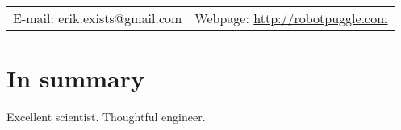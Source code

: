 \documentclass[margin,line]{res}
\begin{document}
\newcommand{\link}[1]{\texttt{#1}}
\providecommand{\tightlist}{%
    \setlength{\itemsep}{0pt}\setlength{\parskip}{0pt}}



\begin{resume}
\section{\sc }
\vspace{.05in}

\begin{tabular}{@{}p{2in}p{4in}}
{E-mail:}  erik.exists@gmail.com   & {Webpage:} \href{http://robotpuggle.com}{http://robotpuggle.com} \\
\end{tabular}

\vspace{-.2cm}
\section{\sc In summary}
Excellent scientist. Thoughtful engineer. 







\end{resume}
\end{document}
